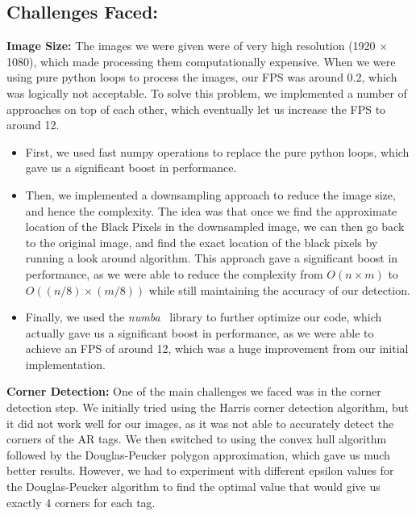 \documentclass[9pt,a4paper,twocolumn,twoside]{tau-class/tau}
\begin{document}
\subsection{Challenges Faced:}
    \textbf{Image Size:} The images we were given were of very high resolution (1920 $\times$ 1080), which made processing them computationally expensive. When we were using pure python loops to process the images, our FPS was around 0.2, which was logically not acceptable. To solve this problem, we implemented a number of approaches on top of each other, which eventually let us increase the FPS to around 12. 
    \begin{itemize}
        \item First, we used fast numpy operations to replace the pure python loops, which gave us a significant boost in performance. 
        \item Then, we implemented a downsampling approach to reduce the image size, and hence the complexity. The idea was that once we find the approximate location of the Black Pixels in the downsampled image, we can then go back to the original image, and find the exact location of the black pixels by running a look around algorithm. This approach gave a significant boost in performance, as we were able to reduce the complexity from $O(n \times m)$ to $O((n/8) \times (m/8))$ while still maintaining the accuracy of our detection.
        \item Finally, we used the \textit{numba}~\cite{numba_jit} library to further optimize our code, which actually gave us a significant boost in performance, as we were able to achieve an FPS of around 12, which was a huge improvement from our initial implementation. 
    \end{itemize}

    \textbf{Corner Detection:} One of the main challenges we faced was in the corner detection step. We initially tried using the Harris corner detection algorithm, but it did not work well for our images, as it was not able to accurately detect the corners of the AR tags. We then switched to using the convex hull algorithm followed by the Douglas-Peucker polygon approximation, which gave us much better results. However, we had to experiment with different epsilon values for the Douglas-Peucker algorithm to find the optimal value that would give us exactly 4 corners for each tag.
\end{document}

